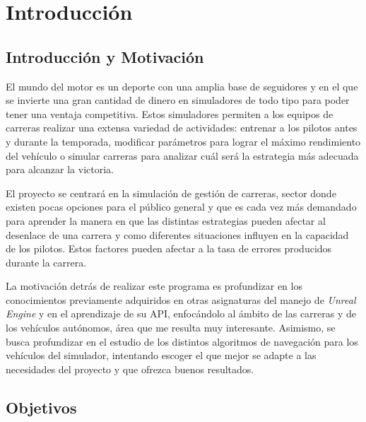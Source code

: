 \chapter{Introducción}
\section{Introducción y Motivación}

El mundo del motor es un deporte con una amplia base de seguidores y en el que se invierte una gran cantidad de dinero en simuladores de todo tipo para poder tener una ventaja competitiva. Estos simuladores permiten a los equipos de carreras realizar una extensa variedad de actividades: entrenar a los pilotos antes y durante la temporada, modificar parámetros para lograr el máximo rendimiento del vehículo o simular carreras para analizar cuál será la estrategia más adecuada para alcanzar la victoria.

\bigskip

El proyecto se centrará en la simulación de gestión de carreras, sector donde existen pocas opciones para el público general y que es cada vez más demandado para aprender la manera en que las distintas estrategias pueden afectar al desenlace de una carrera y como diferentes situaciones influyen en la capacidad de los pilotos. Estos factores pueden afectar a la tasa de errores producidos durante la carrera.



\bigskip


La motivación detrás de realizar este programa es profundizar en los conocimientos previamente adquiridos en otras asignaturas del manejo de \textit{Unreal Engine} y en el aprendizaje de su API, enfocándolo al ámbito de las carreras y de los vehículos autónomos, área que me resulta muy interesante. Asimismo, se busca profundizar en el estudio de los distintos algoritmos de navegación para los vehículos del simulador, intentando escoger el que mejor se adapte a las necesidades del proyecto y que ofrezca buenos resultados.

\newpage

\section{Objetivos}

